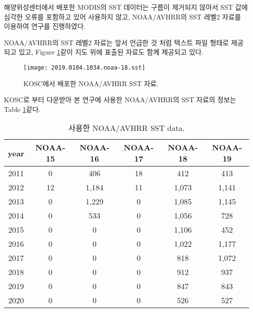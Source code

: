 해양위성센터에서 배포한 MODIS의 SST 데이터는 구름이 제거되지 않아서 SST 값에 심각한 오류를 포함하고 있어 사용하지 않고, NOAA/AVHRR의 SST 레벨2 자료를 이용하여 연구를 진행하였다. 

NOAA/AVHRR의 SST 레벨2 자료는 앞서 언급한 것 처럼 텍스트 파일 형태로 제공되고 있고, Figure \ref{fig:SST-KOSC}\와 같이 지도 위에 표출된 자료도 함께 제공되고 있다. 

\begin{figure}[htbp]
	\centerline{\texttt{[image: 2019.0104.1034.noaa-18.sst]}}
	\caption{KOSC에서 배포한 NOAA/AVHRR SST 자료.}
	\label{fig:SST-KOSC}
\end{figure}

KOSC로 부터 다운받아 본 연구에 사용한 NOAA/AVHRR의 SST 자료의 정보는 Table \ref{table:NOAA-data}\와 같다.

\begin{table}[!htbp]
	\caption{사용한 NOAA/AVHRR SST data.}

	\begin{tabular}{c|c|c|c|c|c}
		\hline
		
		\hline
		year   & NOAA-15 & NOAA-16 & NOAA-17 & NOAA-18 & NOAA-19 \\ 
		
		\hline
		
		\hline
		2011 & 0       & 406     & 18      & 412     & 413     \\ \hline
		2012 & 12      & 1,184   & 11      & 1,073   & 1,141   \\ \hline
		2013 & 0       & 1,229   & 0       & 1,085   & 1,145   \\ \hline
		2014 & 0       & 533     & 0       & 1,056   & 728     \\ \hline
		2015 & 0       & 0       & 0       & 1,106   & 452     \\ \hline
		2016 & 0       & 0       & 0       & 1,022   & 1,177   \\ \hline
		2017 & 0       & 0       & 0       & 818     & 1,072   \\ \hline
		2018 & 0       & 0       & 0       & 912     & 937     \\ \hline
		2019 & 0       & 0       & 0       & 847     & 843     \\ \hline
		2020 & 0       & 0       & 0       & 526     & 527     \\ 
		
		\hline

		\hline
	\end{tabular}
	\label{table:NOAA-data}
\end{table}


